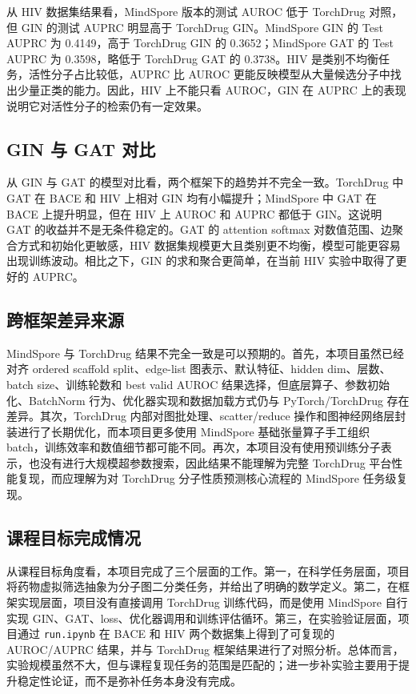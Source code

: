 \documentclass[12pt,hyperref,a4paper,UTF8]{ctexart}
\begin{document}
从 HIV 数据集结果看，MindSpore 版本的测试 AUROC 低于 TorchDrug 对照，但 GIN 的测试 AUPRC 明显高于 TorchDrug GIN。MindSpore GIN 的 Test AUPRC 为 0.4149，高于 TorchDrug GIN 的 0.3652；MindSpore GAT 的 Test AUPRC 为 0.3598，略低于 TorchDrug GAT 的 0.3738。HIV 是类别不均衡任务，活性分子占比较低，AUPRC 比 AUROC 更能反映模型从大量候选分子中找出少量正类的能力。因此，HIV 上不能只看 AUROC，GIN 在 AUPRC 上的表现说明它对活性分子的检索仍有一定效果。

\subsection{GIN 与 GAT 对比}

从 GIN 与 GAT 的模型对比看，两个框架下的趋势并不完全一致。TorchDrug 中 GAT 在 BACE 和 HIV 上相对 GIN 均有小幅提升；MindSpore 中 GAT 在 BACE 上提升明显，但在 HIV 上 AUROC 和 AUPRC 都低于 GIN。这说明 GAT 的收益并不是无条件稳定的。GAT 的 attention softmax 对数值范围、边聚合方式和初始化更敏感，HIV 数据集规模更大且类别更不均衡，模型可能更容易出现训练波动。相比之下，GIN 的求和聚合更简单，在当前 HIV 实验中取得了更好的 AUPRC。

\subsection{跨框架差异来源}

MindSpore 与 TorchDrug 结果不完全一致是可以预期的。首先，本项目虽然已经对齐 ordered scaffold split、edge-list 图表示、默认特征、hidden dim、层数、batch size、训练轮数和 best valid AUROC 结果选择，但底层算子、参数初始化、BatchNorm 行为、优化器实现和数据加载方式仍与 PyTorch/TorchDrug 存在差异。其次，TorchDrug 内部对图批处理、scatter/reduce 操作和图神经网络层封装进行了长期优化，而本项目更多使用 MindSpore 基础张量算子手工组织 batch，训练效率和数值细节都可能不同。再次，本项目没有使用预训练分子表示，也没有进行大规模超参数搜索，因此结果不能理解为完整 TorchDrug 平台性能复现，而应理解为对 TorchDrug 分子性质预测核心流程的 MindSpore 任务级复现。

\subsection{课程目标完成情况}

从课程目标角度看，本项目完成了三个层面的工作。第一，在科学任务层面，项目将药物虚拟筛选抽象为分子图二分类任务，并给出了明确的数学定义。第二，在框架实现层面，项目没有直接调用 TorchDrug 训练代码，而是使用 MindSpore 自行实现 GIN、GAT、loss、优化器调用和训练评估循环。第三，在实验验证层面，项目通过 \texttt{run.ipynb} 在 BACE 和 HIV 两个数据集上得到了可复现的 AUROC/AUPRC 结果，并与 TorchDrug 框架结果进行了对照分析。总体而言，实验规模虽然不大，但与课程复现任务的范围是匹配的；进一步补实验主要用于提升稳定性论证，而不是弥补任务本身没有完成。
\end{document}
